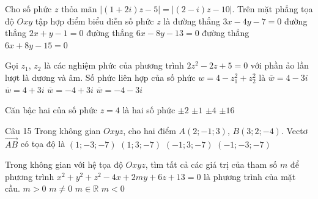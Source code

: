 \begin{ex}%
Cho số phức $z$ thỏa mãn $|(1+2i)z-5|=|(2-i)z-10|$. Trên mặt phẳng tọa độ $Oxy$ tập hợp điểm biểu diễn số phức $z$ là
\choice
{đường thẳng $3x-4y-7=0$}
{đường thẳng $2x+y-1=0$}
{\True đường thẳng $6x-8y-13=0$}
{đường thẳng $6x+8y-15=0$}
\end{ex}

\begin{ex}%
Gọi $z_1$, $z_2$ là các nghiệm phức của phương trình $2z^2-2z+5=0$ với phần ảo lần lượt là dương và âm. Số phức liên hợp của số phức $w=4-z_1^2+z_2^2$ là
\choice
{$\overline{w}=4-3i$}
{\True $\overline{w}=4+3i$}
{$\overline{w}=-4+3i$}
{$\overline{w}=-4-3i$}
\end{ex}

\begin{ex}%
Căn bậc hai của số phức $z=4$ là hai số phức
\choice
{\True $\pm 2$}
{$\pm 1$}
{$\pm 4$}
{$\pm 16$}
\end{ex}

\begin{ex}Câu 15%
Trong không gian $Oxyz$, cho hai điểm $A(2;-1;3)$, $B(3;2;-4)$. Vectơ $\overrightarrow{AB}$ có tọa độ là
\choice
{$(1;-3;-7)$}
{\True $(1;3;-7)$}
{$(-1;3;-7)$}
{$(-1;-3;-7)$}
\end{ex}

\begin{ex}%
Trong không gian với hệ tọa độ $O x y z$, tìm tất cả các giá trị của tham số $m$ để phương trình $x^{2}+y^{2}+z^{2}-4 x+2 m y+6 z+13=0$ là phương trình của mặt cầu.
\choice
{$m>0$}
{\True $m \neq 0$}
{$m \in \mathbb{R}$}
{$m<0$}
\end{ex}

